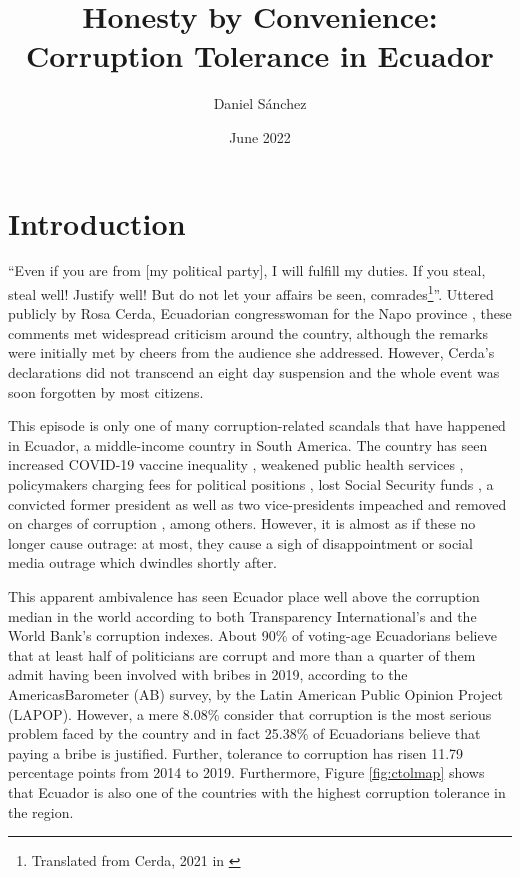 \documentclass[12pt,a4]{article}
\title{Honesty by Convenience: Corruption Tolerance in Ecuador}
\author{Daniel Sánchez}
\date{June 2022}
\begin{document}


\section{Introduction}
\enquote{Even if you are from [my political party], I will fulfill my duties. If you steal, steal well!  Justify well! But do not let your affairs be seen, comrades\footnote{Translated from Cerda, 2021 in \cite[para. 2]{PlanV.2021}}}. Uttered publicly by Rosa Cerda, Ecuadorian congresswoman for the Napo province \parencite{Castro.2021}, these comments met widespread criticism around the country, although the remarks were initially met by cheers from the audience she addressed. However, Cerda's declarations did not transcend an eight day suspension \parencite{Ordonez.2021} and the whole event was soon forgotten by most citizens. 

This episode is only one of many corruption-related scandals that have happened in Ecuador, a middle-income country in South America. The country has seen increased COVID-19 vaccine inequality \parencite{Taj.2021}, weakened public health services \parencite{Celi.2020}, policymakers charging fees for political positions \parencite{Espinosa.2021}, lost Social Security funds \parencite{Pesantes.9152020}, a convicted former president as well as two vice-presidents impeached and removed on charges of corruption \parencite{Cabrera.2020}, among others. However, it is almost as if these no longer cause outrage: at most, they cause a sigh of disappointment or social media outrage which dwindles shortly after.

This apparent ambivalence has seen Ecuador place well above the corruption median in the world according to both Transparency International's and the World Bank's corruption indexes. About 90\% of voting-age Ecuadorians believe that at least half of politicians are corrupt and more than a quarter of them admit having been involved with bribes in 2019, according to the AmericasBarometer (AB) survey, by the Latin American Public Opinion Project (LAPOP). However, a mere 8.08\% consider that corruption is the most serious problem faced by the country and in fact 25.38\% of Ecuadorians believe that paying a bribe is justified. Further, tolerance to corruption has risen 11.79 percentage points from 2014 to 2019. Furthermore, Figure \ref{fig:ctolmap} shows that Ecuador is also one of the countries with the highest corruption tolerance in the region.

\end{document}
